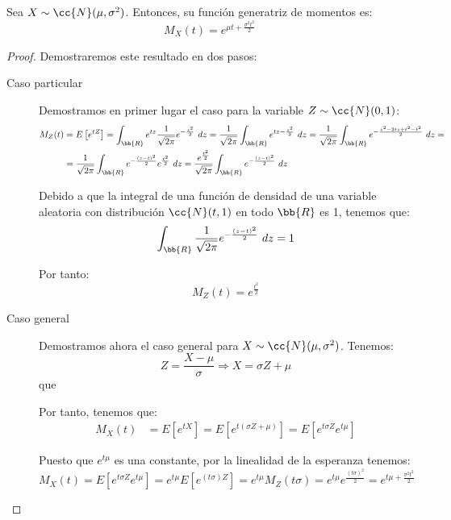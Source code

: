 \begin{prop}
    Sea $X\sim \cc{N}(\mu,\sigma^2)$. Entonces, su función generatriz de momentos es:
    \begin{equation*}
        M_X(t) = e^{\mu t + \frac{\sigma^2 t^2}{2}}
    \end{equation*}
\end{prop}
\begin{proof} Demostraremos este resultado en dos pasos:
    \begin{description}
        \item[Caso particular]  Demostramos en primer lugar el caso para la variable $Z\sim \cc{N}(0,1)$:
        \begin{align*}
            M_Z(t) &= E\left[e^{tZ}\right]
            = \int_\bb{R} e^{tz} \dfrac{1}{\sqrt{2\pi}} e^{-\frac{z^2}{2}}~dz
            = \dfrac{1}{\sqrt{2\pi}} \int_\bb{R} e^{tz-\frac{z^2}{2}}~dz
            = \dfrac{1}{\sqrt{2\pi}} \int_\bb{R} e^{-\frac{z^2-2tz + t^2-t^2}{2}}~dz
            =\\&= \dfrac{1}{\sqrt{2\pi}} \int_\bb{R} e^{-\frac{(z-t)^2}{2}}e^{\frac{t^2}{2}}~dz
            = \dfrac{e^{\frac{t^2}{2}}}{\sqrt{2\pi}} \int_\bb{R} e^{-\frac{(z-t)^2}{2}}~dz
        \end{align*}

        Debido a que la integral de una función de densidad de una variable aleatoria con distribución $\cc{N}(t,1)$ en todo $\bb{R}$ es 1, tenemos que:
        \begin{equation*}
            \int_\bb{R} \dfrac{1}{\sqrt{2\pi}} e^{-\frac{(z-t)^2}{2}}~dz = 1
        \end{equation*}

        Por tanto:
        \begin{equation*}
            M_Z(t) = e^{\frac{t^2}{2}}
        \end{equation*}

        \item[Caso general]  Demostramos ahora el caso general para $X\sim \cc{N}(\mu,\sigma^2)$. Tenemos:
        \begin{equation*}
            Z = \dfrac{X-\mu}{\sigma} \Longrightarrow X = \sigma Z + \mu
        \end{equation*}que
    
        Por tanto, tenemos que:
        \begin{align*}
            M_X(t) &= E\left[e^{tX}\right] = E\left[e^{t(\sigma Z + \mu)}\right] = E\left[e^{t\sigma Z}e^{t\mu}\right]
        \end{align*}
    
        Puesto que $e^{t\mu}$ es una constante, por la linealidad de la esperanza tenemos:
        \begin{equation*}
            M_X(t) = E\left[e^{t\sigma Z}e^{t\mu}\right] = e^{t\mu}E\left[e^{(t\sigma) Z}\right]
            = e^{t\mu}M_Z(t\sigma) = e^{t\mu}e^{\frac{(t\sigma)^2}{2}} = e^{t\mu + \frac{\sigma^2 t^2}{2}}
        \end{equation*}
    \end{description}
\end{proof}

